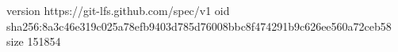 version https://git-lfs.github.com/spec/v1
oid sha256:8a3c46e319c025a78efb9403d785d76008bbc8f474291b9c626ee560a72ceb58
size 151854
